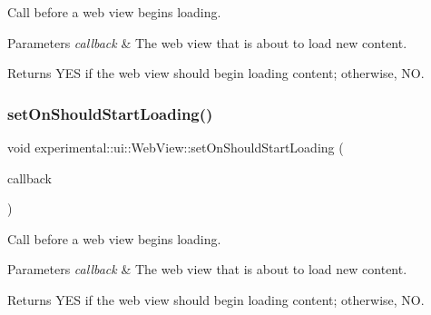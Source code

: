Call before a web view begins loading.


\begin{DoxyParams}{Parameters}
{\em callback} & The web view that is about to load new content. \\
\hline
\end{DoxyParams}
\begin{DoxyReturn}{Returns}
Y\+ES if the web view should begin loading content; otherwise, NO. 
\end{DoxyReturn}
\mbox{\label{classexperimental_1_1ui_1_1WebView_a212732b5b2ec9bd73084c57a140b5dd8}} 
\subsubsection{\texorpdfstring{set\+On\+Should\+Start\+Loading()}{setOnShouldStartLoading()}\hspace{0.1cm}{\footnotesize\ttfamily [2/2]}}
{\footnotesize\ttfamily void experimental\+::ui\+::\+Web\+View\+::set\+On\+Should\+Start\+Loading (\begin{DoxyParamCaption}\item[{const std\+::function$<$ bool(\hyperlink{classexperimental_1_1ui_1_1WebView}{Web\+View} $\ast$sender, const std\+::string \&url)$>$ \&}]{callback }\end{DoxyParamCaption})}

Call before a web view begins loading.


\begin{DoxyParams}{Parameters}
{\em callback} & The web view that is about to load new content. \\
\hline
\end{DoxyParams}
\begin{DoxyReturn}{Returns}
Y\+ES if the web view should begin loading content; otherwise, NO. 
\end{DoxyReturn}
\mbox{\label{classexperimental_1_1ui_1_1WebView_affeb7e462605d9749c63500e640e2c7a}} 
